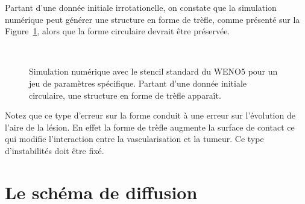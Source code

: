 \documentclass[main.tex]{subfiles}
\begin{document}
Partant d'une donnée initiale irrotationelle, on constate que la simulation numérique peut générer une structure en forme de trèfle, comme présenté sur la Figure~\ref{fig:simu_clover}, alors que la forme circulaire devrait être préservée. 
\begin{figure}[h!]
  \centering
\\
\caption{Simulation numérique avec le stencil standard du WENO5 pour un jeu de paramètres spécifique. Partant d'une donnée initiale circulaire, une structure en forme de trèfle apparaît.} \label{fig:simu_clover}
\end{figure}

Notez que ce type d'erreur sur la forme conduit à une erreur sur l'évolution de l'aire de la lésion. En effet la forme de trèfle augmente la surface de contact ce qui modifie l'interaction entre la vascularisation et la tumeur. Ce type d'instabilités doit être fixé.


\section{Le schéma de diffusion}
\end{document}

